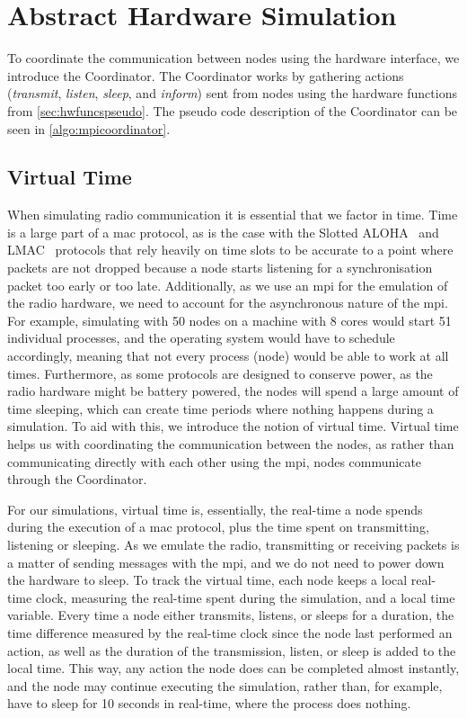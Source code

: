 \section{Abstract Hardware Simulation}\label{sec:coordinator}
To coordinate the communication between nodes using the hardware interface, we introduce the Coordinator. The
Coordinator works by gathering actions (\textit{transmit}, \textit{listen}, \textit{sleep}, and
\textit{inform}) sent from nodes using the hardware functions from \autoref{sec:hwfuncspseudo}. The pseudo
code description of the Coordinator can be seen in \autoref{algo:mpicoordinator}.

\subsection{Virtual Time}\label{sec:virtual-time}
When simulating radio communication it is essential that we factor in time. Time is a large part of a
\gls{mac} protocol, as is the case with the Slotted ALOHA~\cite{Roberts:1975:APS:1024916.1024920} and
LMAC~\cite{paper:lmac_protocol} protocols that rely heavily on time slots to be accurate to a point where
packets are not dropped because a node starts listening for a synchronisation packet too early or too late.
Additionally, as we use an \acrshort{mpi} for the emulation of the radio hardware, we need to account for the
asynchronous nature of the \acrshort{mpi}. For example, simulating with 50 nodes on a machine with 8
cores would start 51 individual processes, and the operating system would have to schedule accordingly,
meaning that not every process (node) would be able to work at all times. Furthermore, as some protocols are
designed to conserve power, as the radio hardware might be battery powered, the nodes will spend a large
amount of time sleeping, which can create time periods where nothing happens during a simulation. To aid with
this, we introduce the notion of virtual time. Virtual time helps us with coordinating the communication
between the nodes, as rather than communicating directly with each other using the \gls{mpi}, nodes
communicate through the Coordinator. \smallbreak

For our simulations, virtual time is, essentially, the real-time a node spends during the execution of a
\gls{mac} protocol, plus the time spent on transmitting, listening or sleeping. As we emulate the radio,
transmitting or receiving packets is a matter of sending messages with the \gls{mpi}, and we do not need to
power down the hardware to sleep. To track the virtual time, each node keeps a local real-time clock,
measuring the real-time spent during the simulation, and a local time variable. Every time a node either
transmits, listens, or sleeps for a duration, the time difference measured by the real-time clock since the
node last performed an action, as well as the duration of the transmission, listen, or sleep is added to the
local time. This way, any action the node does can be completed almost instantly, and the node may continue
executing the simulation, rather than, for example, have to sleep for 10 seconds in real-time, where the
process does nothing.

